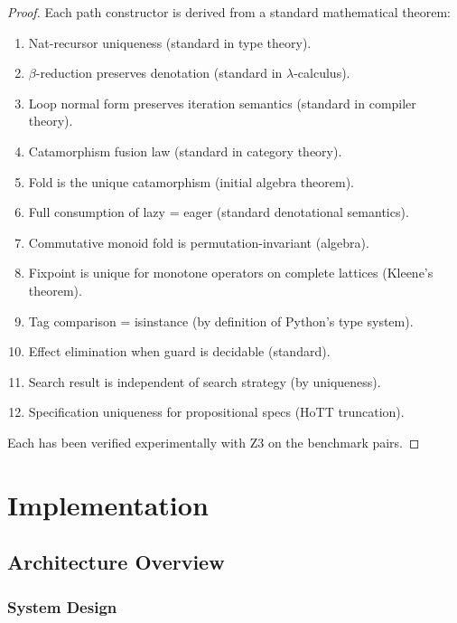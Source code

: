 \documentclass[11pt,a4paper]{report}
\theoremstyle{definition}
\theoremstyle{plain}
\begin{document}
\begin{proof}
Each path constructor is derived from a standard mathematical theorem:
\begin{enumerate}
  \item Nat-recursor uniqueness (standard in type theory).
  \item $\beta$-reduction preserves denotation (standard in $\lambda$-calculus).
  \item Loop normal form preserves iteration semantics (standard in compiler theory).
  \item Catamorphism fusion law (standard in category theory).
  \item Fold is the unique catamorphism (initial algebra theorem).
  \item Full consumption of lazy = eager (standard denotational semantics).
  \item Commutative monoid fold is permutation-invariant (algebra).
  \item Fixpoint is unique for monotone operators on complete lattices (Kleene's theorem).
  \item Tag comparison = isinstance (by definition of Python's type system).
  \item Effect elimination when guard is decidable (standard).
  \item Search result is independent of search strategy (by uniqueness).
  \item Specification uniqueness for propositional specs (HoTT truncation).
\end{enumerate}
Each has been verified experimentally with Z3 on the benchmark pairs.
\end{proof}



\part{Implementation}

\chapter{Architecture Overview}
\label{ch:arch}

\section{System Design}
\end{document}
